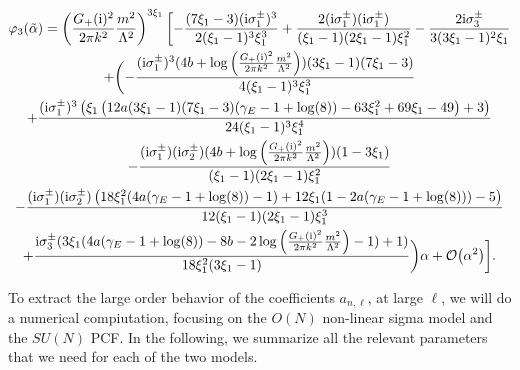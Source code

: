 \documentclass[a4paper,11pt]{article}
\theoremstyle{definition}
\newcommand{\ri}{{\rm i}}
\begin{document}
\begin{multline}
\varphi_3(\tilde\alpha) = \left( \frac{G_+(\ri)^2}{2\pi k^2} \frac{m^2}{\Lambda^2} \right)^{3\xi_1} \biggl[ -\frac{(7 \xi_1-3) (\ri\sigma_1^\pm)^3}{2(\xi_1-1)^3\xi_1^3} + \frac{2 (\ri\sigma_1^\pm) (\ri\sigma_1^\pm)}{(\xi_1-1)(2\xi_1-1)\xi_1^2} - \frac{2 \ri \sigma_3^\pm}{3(3 \xi_1-1)^2\xi_1}\\
+ \biggl( -\frac{ (\ri\sigma_1^\pm)^3 (4b + \log\left( \frac{G_+(\ri)^2}{2\pi k^2} \frac{m^2}{\Lambda^2} \right) ) (3 \xi_1-1) (7 \xi_1-3)}{4(\xi_1-1)^3 \xi_1^3}\\
+\frac{ (\ri\sigma_1^\pm)^3 \left(\xi_1 \left(12 a (3 \xi_1-1) (7 \xi_1-3) (\gamma_E -1+\log (8))-63 \xi_1^2+69 \xi_1-49\right)+3\right)}{24 (\xi_1-1)^3 \xi_1^4}\\
-\frac{(\ri\sigma_1^\pm) (\ri\sigma_2^\pm) (4 b + \log\left( \frac{G_+(\ri)^2}{2\pi k^2} \frac{m^2}{\Lambda^2} \right) ) (1-3 \xi_1)}{(\xi_1-1)(2 \xi_1-1) \xi_1^2 }\\
- \frac{(\ri\sigma_1^\pm) (\ri\sigma_2^\pm) \left(18 \xi_1^2 (4 a (\gamma_E -1+\log (8))-1)+12 \xi_1 (1-2 a (\gamma_E -1+\log (8)))-5\right)}{12 (\xi_1-1) (2 \xi_1-1) \xi_1^3}\\
+ \frac{\ri \sigma_3^\pm (3 \xi_1 (4 a (\gamma_E -1+\log (8))-8 b - 2 \log\left( \frac{G_+(\ri)^2}{2\pi k^2} \frac{m^2}{\Lambda^2} \right) -1)+1)}{18 \xi_1^2 (3 \xi_1-1)} \biggr) \alpha + \mathcal{O}\big(\alpha^2\big)
\biggr].
\label{eq_coeff_bosonic_3}
\end{multline}


To extract the large order behavior of the coefficients $a_{n,\ell}$, at large $\ell$, we will do a numerical compiutation, focusing on the $O(N)$ non-linear sigma model and the $SU(N)$ PCF. In the following, we summarize all the relevant parameters that we need for each of the two models.
\end{document}
